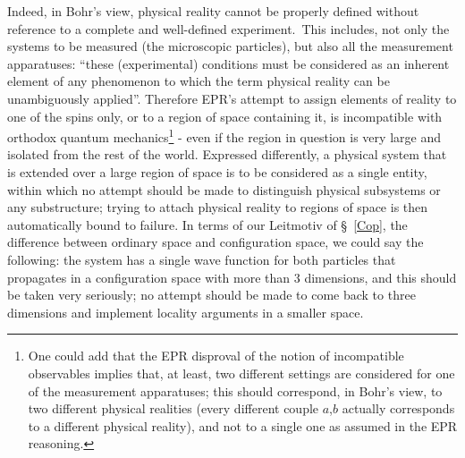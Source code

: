 \documentclass[12pt,onecolumn]{article}%
\begin{document}
{}Indeed, in Bohr's view, physical reality cannot be properly defined without
reference to a complete and well-defined experiment.\ This includes, not only
the systems to be measured (the microscopic particles), but also all the
measurement apparatuses: ``these (experimental) conditions must be considered
as an inherent element of any phenomenon to which the term physical reality
can be unambiguously applied''. Therefore EPR's attempt to assign elements of
reality to one of the spins only, or to a region of space containing it, is
incompatible with orthodox quantum mechanics\footnote{One could add that the
EPR disproval of the notion of incompatible observables implies that, at
least, two different settings are considered for one of the measurement
apparatuses; this should correspond, in Bohr's view, to two different physical
realities (every different couple $a$,$b$ actually corresponds to a different
physical reality), and not to a single one as assumed in the EPR reasoning.} -
even if the region in question is very large and isolated from the rest of the
world. Expressed differently, a physical system that is extended over a large
region of space is to be considered as a single entity, within which no
attempt should be made to distinguish physical subsystems or any substructure;
trying to attach physical reality to regions of space is then automatically
bound to failure. In terms of our Leitmotiv of \S \ \ref{Cop}, the difference
between ordinary space and configuration space, we could say the following:
the system has a single wave function for both particles that propagates in a
configuration space with more than 3 dimensions, and this should be taken very
seriously; no attempt should be made to come back to three dimensions and
implement locality arguments in a smaller space.
\end{document}
